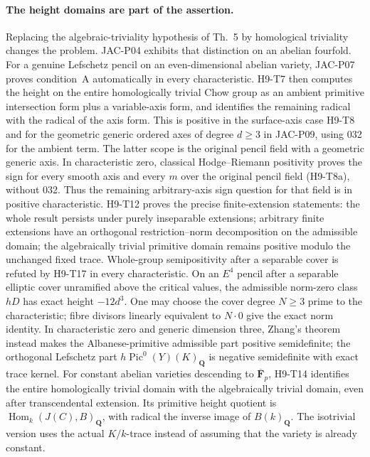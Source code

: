 \documentclass[11pt,a4paper]{article}
\begin{document}
\paragraph{The height domains are part of the assertion.}
Replacing the algebraic-triviality hypothesis of Th.~5 by
homological triviality changes the problem. JAC-P04 exhibits that
distinction on an abelian fourfold. For a genuine Lefschetz pencil
on an even-dimensional abelian variety, JAC-P07 proves condition~A
automatically in every characteristic. H9-T7 then computes the
height on the entire homologically trivial Chow group as an
ambient primitive intersection form plus a variable-axis form,
and identifies the remaining radical with the radical of the axis
form. This is positive in the surface-axis case
H9-T8 and for the geometric generic ordered axes of degree
$d\ge3$ in JAC-P09, using 032 for the ambient term. The latter
scope is the original pencil field with a geometric generic axis.
In characteristic zero, classical Hodge--Riemann positivity proves
the sign for every smooth axis and every $m$ over the original
pencil field (H9-T8a), without 032. Thus the remaining arbitrary-axis
sign question for that field is in positive characteristic.
H9-T12 proves the precise finite-extension statements: the whole
result persists under purely inseparable extensions; arbitrary
finite extensions have an orthogonal restriction--norm
decomposition on the admissible domain; the algebraically trivial
primitive domain remains positive modulo the unchanged fixed trace.
Whole-group semipositivity after a separable cover is refuted by
H9-T17 in every characteristic. On an $E^4$ pencil after a
separable elliptic cover unramified above the critical values,
the admissible norm-zero class $hD$ has exact height $-12d^3$.
One may choose the cover degree $N\ge3$ prime to the
characteristic; fibre divisors linearly equivalent to $N\cdot0$
give the exact norm identity. In characteristic zero and generic
dimension three, Zhang's theorem instead makes the
Albanese-primitive admissible part positive semidefinite; the
orthogonal Lefschetz part $h\operatorname{Pic}^0(Y)(K)_{\mathbf Q}$
is negative semidefinite with exact trace kernel.
For constant abelian varieties descending to
$\overline{\mathbf F}_p$, H9-T14 identifies the entire homologically
trivial domain with the algebraically trivial domain, even after
transcendental extension. Its primitive height quotient is
$\operatorname{Hom}_k(J(C),B)_{\mathbf Q}$, with radical the
inverse image of $B(k)_{\mathbf Q}$. The isotrivial version uses
the actual $K/k$-trace instead of assuming that the variety is
already constant.
\end{document}
